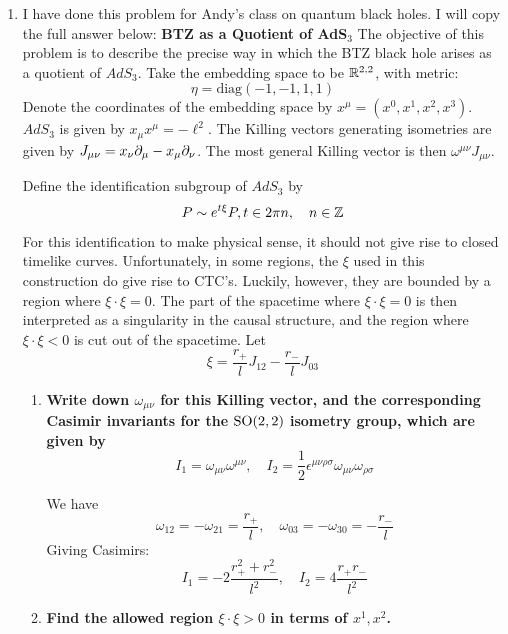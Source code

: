 \documentclass[11pt, class=article, crop=false]{standalone}
\begin{document}
\begin{enumerate}
	\item I have done this problem for Andy's class on quantum black holes. I will copy the full answer below: 
	\textbf{BTZ as a Quotient of AdS$_3$}
	The objective of this problem is to describe the precise way in which the BTZ black hole arises as a quotient of $AdS_3$. Take the embedding space to be $\mathbb{R}^{2,2}$, with metric:
	\[
		\eta = \text{diag}(-1, -1, 1, 1)
	\]
	Denote the coordinates of the embedding space by $x^\mu =(x^0, x^1, x^2,x^3)$. $AdS_3$ is given by $x_\mu x^\mu = -\ell^2$. The Killing vectors generating isometries are given by $J_{\mu \nu} = x_{\nu} \partial_\mu - x_\mu \partial_\nu$. The most general Killing vector is then $\omega^{\mu \nu} J_{\mu \nu}$. 
	
	Define the identification subgroup of $AdS_3$ by 
	\[
		P \sim e^{t \xi} P, t \in 2 \pi n, \quad n \in \mathbb{Z}
	\]
	For this identification to make physical sense, it should not give rise to closed timelike curves. Unfortunately, in some regions, the $\xi$ used in this construction do give rise to CTC’s. Luckily, however, they are bounded by a region where $\xi \cdot \xi = 0$. The part of the spacetime where $\xi \cdot \xi = 0$ is then interpreted as a singularity in the causal structure, and the region where $\xi \cdot \xi < 0$ is cut out of the spacetime. Let
	\[
		\xi = \frac{r_+}{l} J_{12} - \frac{r_-}{l} J_{03}
	\]
	
	\begin{enumerate}
		\item \textbf{Write down $\omega_{\mu \nu}$ for this Killing vector, and the corresponding Casimir invariants for the $\mathrm{SO}(2,2)$ isometry group, which are given by}
		\[
			I_1= \omega_{\mu \nu} \omega^{\mu \nu}, \quad I_2 = \frac12 \epsilon^{\mu \nu \rho \sigma} \omega_{\mu \nu} \omega_{\rho \sigma}
		\]
		
		 We have 
		\[
			\omega_{12} = - \omega_{21} = \frac{r_+}{l}, \quad \omega_{03} = -\omega_{30} = - \frac{r_-}{l}
		\]
		Giving Casimirs:
		\[
			I_1 = -2 \frac{r_+^2 + r_-^2}{l^2}, \quad I_2 = 4 \frac{r_+ r_-}{l^2}
		\]
		\item \textbf{Find the allowed region $\xi \cdot \xi > 0$ in terms of $x^1, x^2$.}
		

\end{enumerate}
\end{enumerate}
\end{document}
